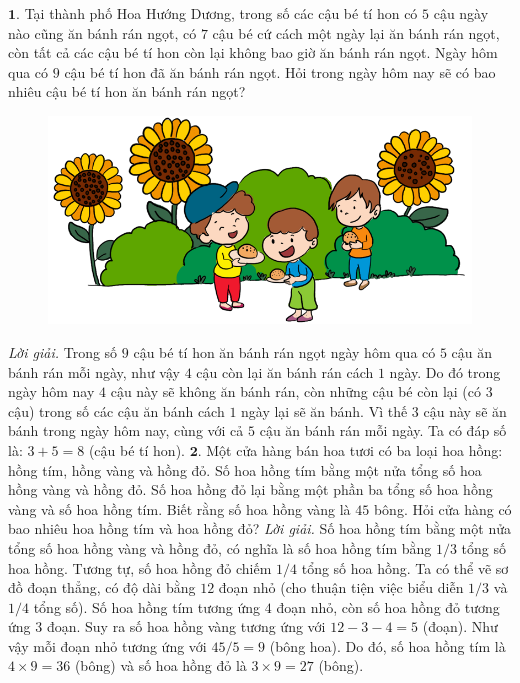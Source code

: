 \begin{multicols}{2}
	$\pmb{1.}$ 	Tại thành phố Hoa Hướng Dương, trong số các cậu bé tí hon có $5$ cậu ngày nào cũng ăn bánh rán ngọt, có $7$ cậu bé cứ cách một ngày lại ăn bánh rán ngọt, còn tất cả các cậu bé tí hon còn lại không bao giờ ăn bánh rán ngọt. Ngày hôm qua có $9$ cậu bé tí hon đã ăn bánh rán ngọt. Hỏi trong ngày hôm nay sẽ có bao nhiêu cậu bé tí hon ăn bánh rán ngọt?
	\begin{figure}[H]
		\centering
		\vspace*{-5pt}
		\captionsetup{labelformat= empty, justification=centering}
		\includegraphics[width=1\linewidth]{Pi9_bai1}
		\vspace*{-15pt}
	\end{figure}
	\textit{Lời giải.} 	Trong số $9$ cậu bé tí hon ăn bánh rán ngọt ngày hôm qua có $5$ cậu ăn bánh rán mỗi ngày, như vậy $4$ cậu còn lại ăn bánh rán cách $1$ ngày. Do đó trong ngày hôm nay $4$ cậu này sẽ không ăn bánh rán, còn những cậu bé còn lại (có $3$ cậu) trong số các cậu ăn bánh cách $1$ ngày lại sẽ ăn bánh. Vì thế $3$ cậu này sẽ ăn bánh trong ngày hôm nay, cùng với cả $5$ cậu ăn bánh rán mỗi ngày. Ta có đáp số là: $3+5 = 8$ (cậu bé tí hon).
	\vskip 0.1cm
	$\pmb{2.}$ Một cửa hàng bán hoa tươi có ba loại hoa hồng: hồng tím, hồng vàng và hồng đỏ. Số hoa hồng tím bằng một nửa tổng số hoa hồng vàng và hồng đỏ. Số hoa hồng đỏ lại bằng một phần ba tổng số hoa hồng vàng và số hoa hồng tím. Biết rằng số hoa hồng vàng là $45$ bông. Hỏi cửa hàng có bao nhiêu hoa hồng tím và hoa hồng đỏ?
	\vskip 0.1cm
	\textit{Lời giải.} 	Số hoa hồng tím bằng một nửa tổng số hoa hồng vàng và hồng đỏ, có nghĩa là số hoa hồng tím bằng $1/3$ tổng số hoa hồng. Tương tự, số hoa hồng đỏ chiếm $1/4$ tổng số hoa hồng. Ta có thể vẽ sơ đồ đoạn thẳng, có độ dài bằng $12$ đoạn nhỏ (cho thuận tiện việc biểu diễn $1/3$ và $1/4$ tổng số). Số hoa hồng tím tương ứng $4$ đoạn nhỏ, còn số hoa hồng đỏ tương ứng $3$ đoạn. Suy ra số hoa hồng vàng tương ứng với $12 - 3 - 4 = 5$ (đoạn). Như vậy mỗi đoạn nhỏ tương ứng với $45/5 = 9$ (bông hoa). Do đó, số hoa hồng tím là $4\times 9=36$ (bông) và số hoa hồng đỏ là $3\times 9=27$ (bông).

\end{multicols}
